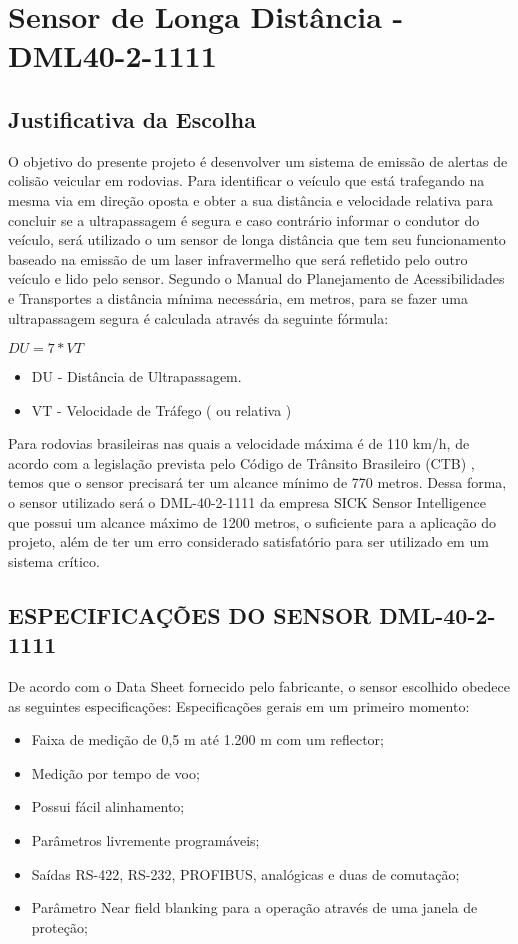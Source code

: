 \section{Sensor de Longa Distância - DML40-2-1111}


\subsection{Justificativa da Escolha}

O objetivo do presente projeto é desenvolver um sistema de emissão de alertas de colisão veicular em rodovias. Para identificar o veículo que está trafegando na mesma via em direção oposta e obter a sua distância e velocidade relativa para concluir se a ultrapassagem é segura e caso contrário informar o condutor do veículo, será utilizado o um sensor de longa distância que tem seu funcionamento baseado na emissão de um laser infravermelho que será refletido pelo outro veículo e lido pelo sensor.
Segundo o Manual do Planejamento de Acessibilidades e Transportes \cite{sensorLaserDML40} a distância mínima necessária, em metros, para se fazer uma ultrapassagem segura é calculada através da seguinte fórmula:

$DU = 7*VT$
\begin{itemize}
  \item DU - Distância de Ultrapassagem.
  \item VT - Velocidade de Tráfego ( ou relativa )
\end{itemize}

Para rodovias brasileiras nas quais a velocidade máxima é de 110 km/h, de acordo com a legislação prevista pelo Código de Trânsito Brasileiro (CTB) \cite{codigoTransitoBrasileiro}, temos que o sensor precisará ter um alcance mínimo de 770 metros.
Dessa forma, o sensor utilizado será o DML-40-2-1111 da empresa SICK Sensor Intelligence que possui um alcance máximo de 1200 metros, o suficiente para a aplicação do projeto, além de ter um erro considerado satisfatório para ser utilizado em um sistema crítico.

\subsection{ESPECIFICAÇÕES DO SENSOR DML-40-2-1111}
De acordo com o Data Sheet \cite{dataSheetDML40} fornecido pelo fabricante, o sensor escolhido obedece as seguintes especificações:
Especificações gerais em um primeiro momento:

\begin{itemize}
	\item Faixa de medição de 0,5 m até 1.200 m com um reflector;
	\item Medição por tempo de voo;
	\item Possui fácil alinhamento;
	\item Parâmetros livremente programáveis;
	\item Saídas RS-422, RS-232, PROFIBUS, analógicas e duas de comutação;
	\item Parâmetro Near field blanking para a operação através de uma janela de proteção;
\end{itemize}

